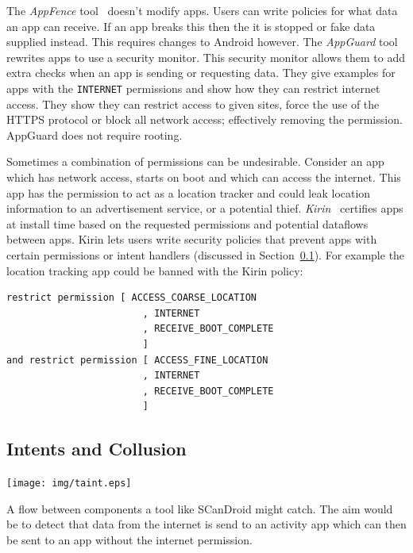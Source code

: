 \documentclass[a4paper]{article}
\begin{document}
The \emph{AppFence} tool~\cite{Hornyack:2011wq} doesn't modify apps.  Users can
write policies for what data an app can receive. If an app breaks this then the
it is stopped or fake data supplied instead.  This requires changes to Android
however. The \emph{AppGuard} tool~\cite{Backes:2012vm,Backes:2013ec} rewrites
apps to use a security monitor.  This security monitor allows them to add extra
checks when an app is sending or requesting data.  They give examples for apps
with the \texttt{INTERNET} permissions and show how they can restrict internet
access.  They show they can restrict access to given sites, force the use of the
HTTPS protocol or block all network access; effectively removing the permission.
AppGuard does not require rooting.

Sometimes a combination of permissions can be undesirable.  Consider an app
which has network access, starts on boot and which can access the internet.
This app has the permission to act as a location tracker and could leak location
information to an advertisement service, or a potential thief.
\emph{Kirin}~\cite{Enck:2009ko} certifies apps at install time based on
the requested permissions and potential dataflows between apps.
Kirin lets users write security policies that prevent apps with certain
permissions or intent handlers (discussed in Section~\ref{sec:intents}).  For
example the location tracking app could be banned with the Kirin policy:

\begin{lstlisting}[language=Kirin]
    restrict permission [ ACCESS_COARSE_LOCATION
                        , INTERNET
                        , RECEIVE_BOOT_COMPLETE
                        ]
and restrict permission [ ACCESS_FINE_LOCATION
                        , INTERNET
                        , RECEIVE_BOOT_COMPLETE
                        ]
\end{lstlisting}

\subsection{Intents and Collusion}\label{sec:intents}

\begin{marginfigure}
  \centering
  \texttt{[image: img/taint.eps]}
  \caption{A flow between components a tool like SCanDroid might
  catch. The aim would be to detect that data from the internet is send to an
activity app which can then be sent to an app without the internet permission.}
  \label{fig:taint}
\end{marginfigure}
\end{document}
